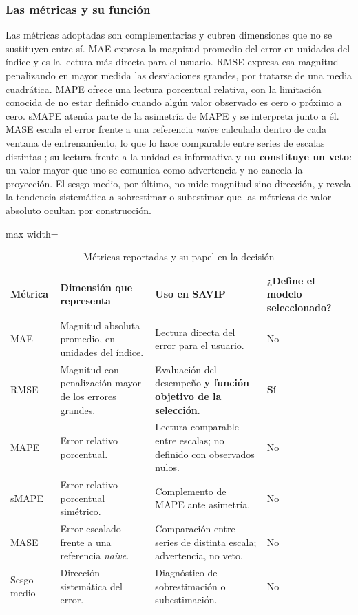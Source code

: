 \documentclass[12pt,letterpaper]{article}
\providecommand{\parencite}{\citep}
\begin{document}
\subsubsection*{Las métricas y su función}

Las métricas adoptadas son complementarias y cubren dimensiones que no se sustituyen entre sí. MAE expresa la magnitud promedio del error en unidades del índice y es la lectura más directa para el usuario. RMSE expresa esa magnitud penalizando en mayor medida las desviaciones grandes, por tratarse de una media cuadrática. MAPE ofrece una lectura porcentual relativa, con la limitación conocida de no estar definido cuando algún valor observado es cero o próximo a cero. sMAPE atenúa parte de la asimetría de MAPE y se interpreta junto a él. MASE escala el error frente a una referencia \emph{naive} calculada dentro de cada ventana de entrenamiento, lo que lo hace comparable entre series de escalas distintas \parencite{hyndman_koehler2006}; su lectura frente a la unidad es informativa y \textbf{no constituye un veto}: un valor mayor que uno se comunica como advertencia y no cancela la proyección. El sesgo medio, por último, no mide magnitud sino dirección, y revela la tendencia sistemática a sobrestimar o subestimar que las métricas de valor absoluto ocultan por construcción.

\begin{table}[H]
\centering
\caption{Métricas reportadas y su papel en la decisión}
\label{tab:metricas_papel}
\vspace{\baselineskip}
\scriptsize
\begin{adjustbox}{max width=\textwidth}
\begin{tabular}{>{\raggedright\arraybackslash}p{}>{\raggedright\arraybackslash}p{}>{\raggedright\arraybackslash}p{}>{\raggedright\arraybackslash}p{}}
\toprule
\textbf{Métrica} & \textbf{Dimensión que representa} & \textbf{Uso en SAVIP} & \textbf{¿Define el modelo seleccionado?} \\
\midrule
MAE & Magnitud absoluta promedio, en unidades del índice. & Lectura directa del error para el usuario. & No \\
RMSE & Magnitud con penalización mayor de los errores grandes. & Evaluación del desempeño \textbf{y función objetivo de la selección}. & \textbf{Sí} \\
MAPE & Error relativo porcentual. & Lectura comparable entre escalas; no definido con observados nulos. & No \\
sMAPE & Error relativo porcentual simétrico. & Complemento de MAPE ante asimetría. & No \\
MASE & Error escalado frente a una referencia \emph{naive}. & Comparación entre series de distinta escala; advertencia, no veto. & No \\
Sesgo medio & Dirección sistemática del error. & Diagnóstico de sobrestimación o subestimación. & No \\
\bottomrule
\end{tabular}
\end{adjustbox}
\end{table}
\end{document}

